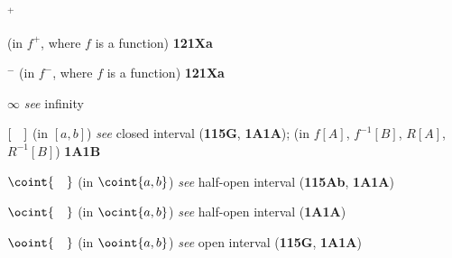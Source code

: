 $^+$
  
  
  (in $f^+$, where $f$ is a function) {\bf 121Xa}
  
  
  


$^-$ (in $f^-$, where $f$ is a function) {\bf 121Xa}






















































$\infty$ {\it see} infinity





$[\hskip1em]$ (in $[a,b]$) {\it see} closed interval ({\bf 115G},
{\bf 1A1A});
  (in $f[A]$, $f^{-1}[B]$, $R[A]$, $R^{-1}[B]$) {\bf 1A1B}





$\coint{\hskip1em}$ (in $\coint{a,b}$) {\it see} half-open interval
({\bf 115Ab}, {\bf 1A1A})

$\ocint{\hskip1em}$ (in $\ocint{a,b}$) {\it see} half-open interval
({\bf 1A1A})

$\ooint{\hskip1em}$ (in $\ooint{a,b}$) {\it see} open interval
({\bf 115G}, {\bf 1A1A})

















\frnewpage


